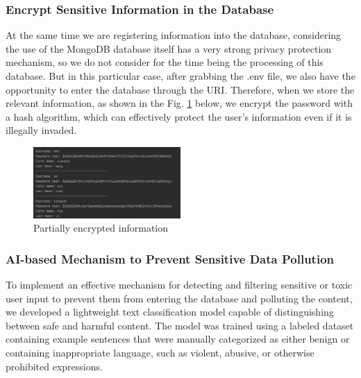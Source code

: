 \documentclass{article}
\begin{document}
\subsubsection{Encrypt Sensitive Information in the Database }
At the same time we are registering information into the database, considering the use of the MongoDB database itself has a very strong privacy protection mechanism, so we do not consider for the time being the processing of this database. 
But in this particular case, after grabbing the .env file, we also have the opportunity to enter the database through the URI. 
Therefore, when we store the relevant information, as shown in the Fig. \ref{fig:hash} below, we encrypt the password with a hash algorithm, which can effectively protect the user's information even if it is illegally invaded.
\begin{figure}[htb]
    \centering
    \includegraphics[width=0.5\textwidth]{images/Partially_encrypted_information.png}
    \caption{Partially encrypted information}
    \label{fig:hash}
\end{figure}
\subsubsection{AI-based Mechanism to Prevent Sensitive Data Pollution }
To implement an effective mechanism for detecting and filtering sensitive or toxic user input to prevent them from entering the database and polluting the content, we developed a lightweight text classification model capable of distinguishing between safe and harmful content. The model was trained using a labeled dataset containing example sentences that were manually categorized as either benign or containing inappropriate language, such as violent, abusive, or otherwise prohibited expressions. 
\end{document}
